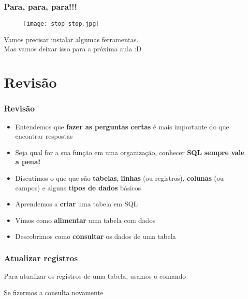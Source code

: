 \documentclass[t, 10pt, aspectratio=169, table, x11names]{beamer}
\begin{document}
	\begin{frame}
		\frametitle{Para, para, para!!!}
		\begin{figure}
			\centering
			\texttt{[image: stop-stop.jpg]}
		\end{figure}
			Vamos precisar instalar algumas ferramentas.\\
			Mas vamos deixar isso para a próxima aula :D
		\highlightboxend
	\end{frame}

	\section{Revisão}

	\begin{frame}
		\frametitle{Revisão}
		\begin{itemize}
			\item Entendemos que \textbf{fazer as perguntas certas} é mais importante do que encontrar respostas
			\bigskip\item Seja qual for a sua função em uma organização, conhecer \textbf{SQL sempre vale a pena!}
			\bigskip\item Discutimos o que que são \textbf{tabelas}, \textbf{linhas} (ou registros), \textbf{colunas} (ou campos) e alguns \textbf{tipos de dados} básicos
			\bigskip\item Aprendemos a \textbf{criar} uma tabela em SQL
			\bigskip\item Vimos como \textbf{alimentar} uma tabela com dados
			\bigskip\item Descobrimos como \textbf{consultar} os dados de uma tabela
		\end{itemize}
	\end{frame}
	
	\begin{frame}
		\frametitle{Atualizar registros}
		Para atualizar os registros de uma tabela, usamos o comando \bluehighlight{UPDATE...SET} 
		
		Se fizermos a consulta novamente
		
		
	\end{frame}
\end{document}
